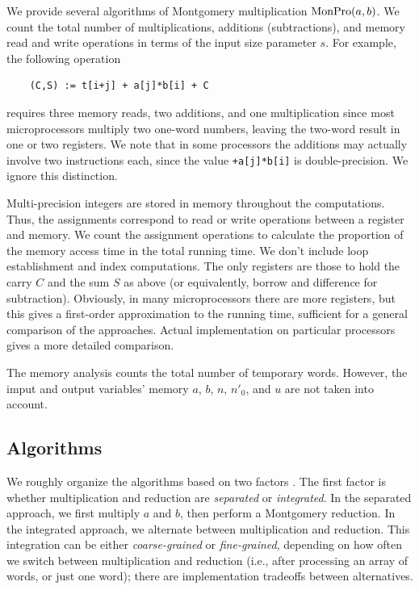 \documentclass[twocolumn]{svjour3}          %
\begin{document}
We provide several algorithms of Montgomery multiplication
$\mbox{MonPro}(a,b)$. We count the total number of multiplications, additions
(subtractions), and memory read and write operations in terms of the
input size parameter $s$.  For example, the following operation
%
\begin{verbatim}
    (C,S) := t[i+j] + a[j]*b[i] + C
\end{verbatim}
%
requires three memory reads, two additions, and one multiplication
since most microprocessors multiply two one-word numbers, leaving the
two-word result in one or two registers. We note that in some
processors the additions may actually involve two instructions each,
since the value \texttt{+a[j]*b[i]} is double-precision. We ignore
this distinction.

Multi-precision integers are stored in memory throughout the
computations. Thus, the assignments correspond to read or write
operations between a register and memory. We count the assignment
operations to calculate the proportion of the memory access time in
the total running time. We don't include loop establishment and index
computations. The only registers are those to hold the carry $C$ and
the sum $S$ as above (or equivalently, borrow and difference for
subtraction).  Obviously, in many microprocessors there are more
registers, but this gives a first-order approximation to the running
time, sufficient for a general comparison of the approaches.  Actual
implementation on particular processors gives a more detailed
comparison.

The memory analysis counts the total number of temporary
words. However, the imput and output variables' memory $a$, $b$, $n$,
$n'_0$, and $u$ are not taken into account.


\subsection{Algorithms}

We roughly organize the algorithms based on two factors
\cite{KAK96:Analyzing}. The first factor is whether multiplication and
reduction are {\em separated} or {\em integrated}. In the separated
approach, we first multiply $a$ and $b$, then perform a Montgomery
reduction. In the integrated approach, we alternate between
multiplication and reduction. This integration can be either {\em
  coarse-grained} or {\em fine-grained}, depending on how often we
switch between multiplication and reduction (i.e., after processing an
array of words, or just one word); there are implementation tradeoffs
between alternatives.
\end{document}

